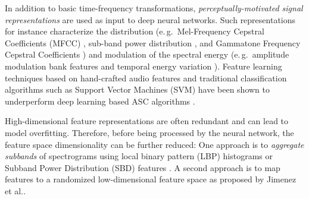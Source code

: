 \documentclass[applsci,article,submit,oneauthor,pdftex]{Definitions/mdpi}
\makeatletter
\newcommand{\etal}{{et al}.\@ }
\newcommand{\eg}{e.\,g.\ }
\makeatother
\begin{document}
In addition to basic time-frequency transformations,
\textit{perceptually-motivated signal representations} are used as input to deep neural networks.
Such representations for instance characterize the distribution (\eg Mel-Frequency Cepstral Coefficients (MFCC) \citep{Li:2018:ASC:ICALIP}, sub-band power distribution \citep{Bisot:2015:ASC:EUSIPCO}, and Gammatone Frequency Cepstral Coefficients \citep{Sharma:2019:SoundClassification:ARXIV}) and modulation of the spectral energy (\eg amplitude modulation bank features \citep{Moritz:2016:TDNN:DCASE} and temporal energy variation \citep{Park:2017:DoubleImageASC:DCASE}). 
Feature learning techniques based on hand-crafted audio features and traditional classification algorithms such as Support Vector Machines (SVM) have been shown to underperform deep learning based ASC algorithms \citep{Fonseca:2017:ASC:DACSE, Maka:2018:FeatureSpaceASC:DCASE}.

High-dimensional feature representations are often redundant and can lead to model overfitting. Therefore, before being processed by the neural network, the feature space dimensionality can be further reduced:
One approach is to \textit{aggregate subbands} of spectrograms using local binary pattern (LBP) histograms \citep{Abidin:2017:LBP:ICASSP} or Subband Power Distribution (SBD) features \citep{Bisot:2015:ASC:EUSIPCO}. A second approach is to map features
 to a randomized low-dimensional feature space as proposed by Jimenez \etal \citep{Jimenez:2017:ShiftInvariantASC:DCASE}.


\end{document}
